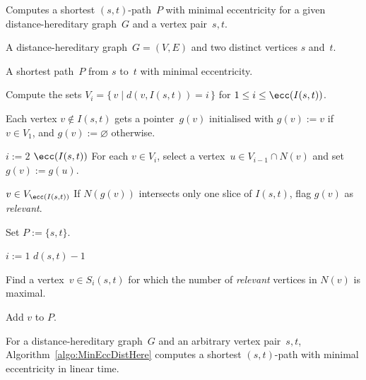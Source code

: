 \begin{algorithm}
    [htb]
    \caption
    {
        \label{algo:MinEccDistHere}
        Computes a shortest $(s,t)$-path~$P$ with minimal eccentricity for a given distance-hereditary graph~$G$ and a vertex pair~$s,t$.
    }

\KwIn
{
    A distance-hereditary graph~$G = (V, E)$ and two distinct vertices $s$ and~$t$.
}

\KwOut
{
    A shortest path~$P$ from $s$ to~$t$ with minimal eccentricity.
}

Compute the sets $V_i = \{ \, v \mid d(v, I(s, t)) = i \, \}$ for $1 \leq i \leq \ecc(I(s,t))$.

Each vertex $v \notin I(s,t)$ gets a pointer~$g(v)$ initialised with $g(v) := v$ if $v \in V_1$, and $g(v) := \varnothing$ otherwise.

\For
{
    $i := 2$ \KwTo $\ecc(I(s,t))$
    \label{line:dhgFindGateLoop}
}
{
    For each $v \in V_i$, select a vertex~$u \in V_{i-1} \cap N(v)$ and set $g(v) := g(u)$.
    \label{line:dhgFindGateIteration}
}

\ForEach
{
    $v \in V_{\ecc(I(s,t))}$
}
{
    If $N(g(v))$ intersects only one slice of $I(s,t)$, flag $g(v)$ as \emph{relevant}.
    \label{line:dhgFlagRelevant}
}

Set $P := \{ s, t \}$.

\For
{
    $i := 1$ \KwTo $d(s,t) - 1$
    \label{line:dhgSelectPLoop}
}
{
    Find a vertex~$v \in S_i(s,t)$ for which the number of \emph{relevant} vertices in $N(v)$ is maximal.

    Add $v$ to $P$.
    \label{line:dhgSelectPAddV}
}

\end{algorithm}


\begin{lemma}
    \label{lem:path-pair}
For a distance-hereditary graph~\( G \) and an arbitrary vertex pair~\( s, t \), Algorithm~\ref{algo:MinEccDistHere} computes a shortest \( (s, t ) \)-path with minimal eccentricity in linear time.
\end{lemma}

